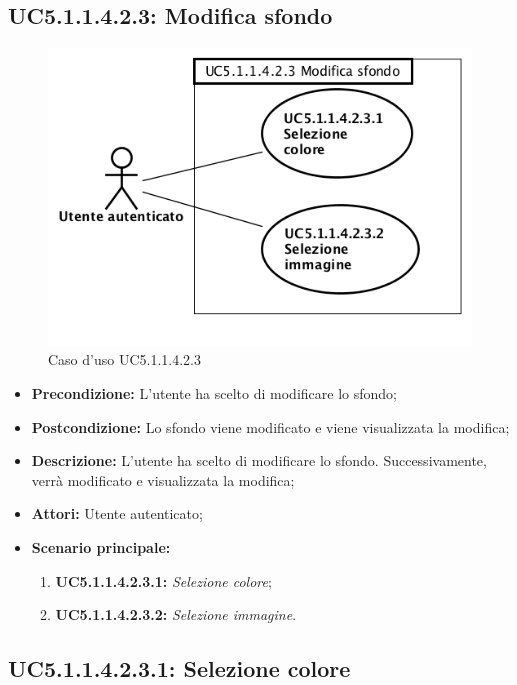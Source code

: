 \subsection{ UC5.1.1.4.2.3: Modifica sfondo}

\begin{figure}[h]
	\begin{center}
	\includegraphics[scale=0.4]{diagram/UC5-1-1-4-2-3.png}
	\caption{Caso d'uso UC5.1.1.4.2.3}
	\end{center}
\end{figure}
\begin{itemize}
	\item \textbf{Precondizione:} L'utente ha scelto di modificare lo sfondo;
	\item \textbf{Postcondizione:} Lo sfondo viene modificato e viene visualizzata la modifica;
	\item \textbf{Descrizione:} L'utente ha scelto di modificare lo sfondo.  Successivamente, verrà modificato e visualizzata la modifica;
	\item \textbf{Attori:} Utente autenticato;
	\item \textbf{Scenario principale:}
	\begin{enumerate}
		\item \textbf{ UC5.1.1.4.2.3.1:} \textit{ Selezione colore};
		\item \textbf{ UC5.1.1.4.2.3.2:} \textit{ Selezione immagine}.
	\end{enumerate}
\end{itemize}
\subsection{ UC5.1.1.4.2.3.1: Selezione colore}

